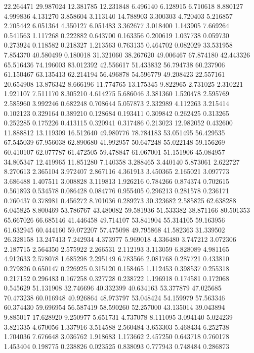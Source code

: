 22.264471
29.987024
12.381785
12.231848
6.496140
6.128915
6.710618
8.880127
4.999836
4.131270
3.858604
3.113140
14.788903
3.300303
4.720403
5.216857
2.705442
6.051364
4.350127
6.051483
3.362677
3.018400
1.143905
7.669264
0.541563
1.117268
0.222882
0.643700
0.163356
0.200619
1.037738
0.059730
0.273924
0.118582
0.218327
1.213563
0.763135
0.464702
0.082029
33.531958
7.854370
40.580499
0.180018
31.321060
38.267620
49.006467
67.874180
42.443326
65.516436
74.196003
83.012392
42.556617
51.433832
56.794738
60.237906
61.150467
63.135413
62.214194
56.496878
54.596779
49.208423
22.557161
20.654908
13.876342
8.666196
11.774765
13.175345
9.822965
2.731025
2.310221
1.921107
7.511170
8.305210
4.614275
5.686046
3.381360
1.520478
2.595769
2.585960
3.992246
0.682248
0.708644
5.057873
2.332989
4.112263
3.215414
0.102123
0.329164
0.389210
0.128684
0.193411
0.309842
0.262425
0.313265
0.252285
0.175226
0.413115
0.320941
0.317486
0.213023
12.982052
0.432600
11.888812
13.119309
16.512640
49.980776
78.784183
53.051495
56.429535
67.545039
67.956038
62.890680
41.992957
50.647248
55.022148
59.156269
60.410107
62.077787
61.472505
59.478847
61.067001
51.151906
45.084957
34.805347
12.419965
11.851280
7.140358
3.288465
3.440140
5.873061
2.622727
8.270613
2.365104
3.972407
2.867116
4.361913
3.450365
2.165021
3.097773
3.686488
1.407511
3.008828
3.119813
1.926216
0.784266
0.874374
0.702615
0.561893
0.534578
0.086428
0.084776
0.955405
0.296213
0.281578
0.236171
0.760437
0.378981
0.456272
8.701036
0.289273
30.323682
2.585825
62.638288
6.045825
8.800469
53.786767
43.480082
59.581936
51.533382
38.871166
80.501353
65.667026
66.685146
41.446458
49.714107
53.841904
55.314105
59.163956
61.632945
60.444160
59.072207
57.475098
49.795868
41.582363
31.339502
26.328158
13.247413
7.242934
4.373977
5.969018
4.336480
3.747212
3.072306
2.187715
2.564350
2.575922
2.266531
2.112193
3.113059
6.828089
4.981165
4.912633
2.578078
1.685298
2.295149
6.783566
2.081768
0.287721
0.433810
0.279826
0.650147
0.226925
0.315120
0.158465
1.112453
0.398537
0.255318
0.217152
0.296483
0.167258
0.327728
0.238722
1.196918
0.174581
0.172068
0.545629
51.131908
32.746696
40.332399
40.634163
53.377879
47.025685
70.473238
60.016948
40.926864
48.973797
53.048424
54.159979
57.563346
60.374430
59.696954
56.587419
58.590260
52.257000
43.135014
39.043894
9.885017
17.628920
9.250977
5.651731
4.737078
8.111095
3.094140
5.024239
3.821335
4.670056
1.337916
3.514588
2.560484
3.653303
5.468434
6.252738
1.704036
7.676648
3.036762
1.918683
1.173662
2.457250
0.643718
0.760178
1.453404
0.198775
0.238826
0.023525
0.838093
0.777943
0.748484
0.286873
